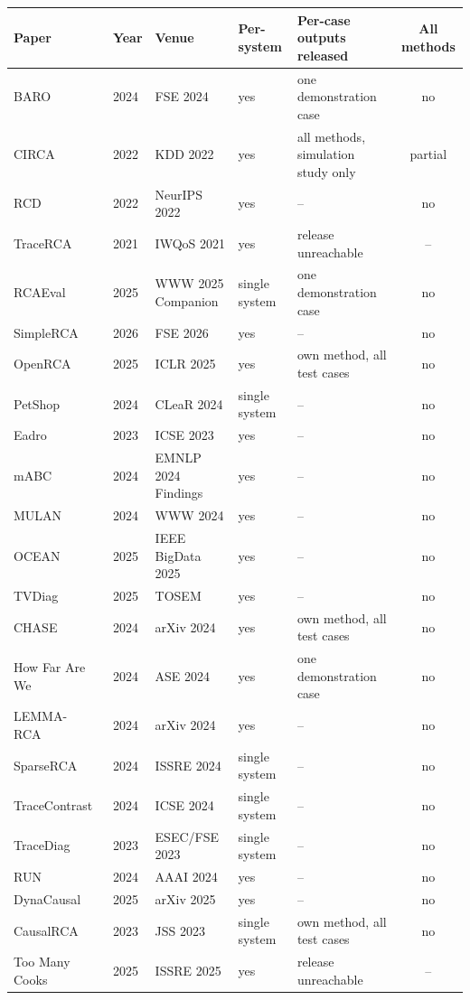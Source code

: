 \setlength{\tabcolsep}{3pt}
\begin{tabular}{@{}lllllc@{}}
\toprule
Paper & Year & Venue & Per-system & Per-case outputs released & All methods \\
\midrule
BARO~\citep{pham2024baro} & 2024 & FSE 2024 & yes & one demonstration case & no \\
CIRCA~\citep{li2022circa} & 2022 & KDD 2022 & yes & all methods, simulation study only & partial \\
RCD~\citep{ikram2022rcd} & 2022 & NeurIPS 2022 & yes & -- & no \\
TraceRCA~\citep{li2021tracerca} & 2021 & IWQoS 2021 & yes & release unreachable & -- \\
RCAEval~\citep{pham2024rcaeval} & 2025 & WWW 2025 Companion & single system & one demonstration case & no \\
SimpleRCA~\citep{fang2025simplerca} & 2026 & FSE 2026 & yes & -- & no \\
OpenRCA~\citep{xu2025openrca} & 2025 & ICLR 2025 & yes & own method, all test cases & no \\
PetShop~\citep{hardt2024petshop} & 2024 & CLeaR 2024 & single system & -- & no \\
Eadro~\citep{lee2023eadro} & 2023 & ICSE 2023 & yes & -- & no \\
mABC~\citep{zhang2024mabc} & 2024 & EMNLP 2024 Findings & yes & -- & no \\
MULAN~\citep{zheng2024mulan} & 2024 & WWW 2024 & yes & -- & no \\
OCEAN~\citep{zheng2025ocean} & 2025 & IEEE BigData 2025 & yes & -- & no \\
TVDiag~\citep{xie2025tvdiag} & 2025 & TOSEM & yes & -- & no \\
CHASE~\citep{zhao2024chase} & 2024 & arXiv 2024 & yes & own method, all test cases & no \\
How Far Are We~\citep{pham2024howfar} & 2024 & ASE 2024 & yes & one demonstration case & no \\
LEMMA-RCA~\citep{zheng2024lemma} & 2024 & arXiv 2024 & yes & -- & no \\
SparseRCA~\citep{yao2024sparserca} & 2024 & ISSRE 2024 & single system & -- & no \\
TraceContrast~\citep{zhang2024tracecontrast} & 2024 & ICSE 2024 & single system & -- & no \\
TraceDiag~\citep{ding2023tracediag} & 2023 & ESEC/FSE 2023 & single system & -- & no \\
RUN~\citep{lin2024run} & 2024 & AAAI 2024 & yes & -- & no \\
DynaCausal~\citep{zhang2025dynacausal} & 2025 & arXiv 2025 & yes & -- & no \\
CausalRCA~\citep{causalrca} & 2023 & JSS 2023 & single system & own method, all test cases & no \\
Too Many Cooks~\citep{zhang2025toomanycooks} & 2025 & ISSRE 2025 & yes & release unreachable & -- \\
\bottomrule
\end{tabular}
